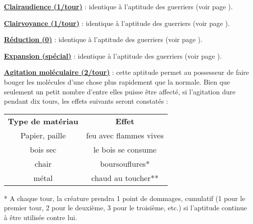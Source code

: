 \bigskip

\textbf{\uline{Clairaudience (1/tour)}} : identique à l'aptitude des guerriers (voir page \pageref{guerrier-clairaudience}).

\bigskip

\textbf{\uline{Clairvoyance (1/tour)}} : identique à l'aptitude des guerriers (voir page \pageref{guerrier-clairvoyance}).

\bigskip

\textbf{\uline{Réduction (0)}} : identique à l'aptitude des guerriers (voir page \pageref{guerrier-reduction}).

\bigskip

\textbf{\uline{Expansion (spécial)}} : identique à l'aptitude des guerriers (voir page \pageref{guerrier-expansion}).

\bigskip

\label{magicien-agitation-mol}\textbf{\uline{Agitation moléculaire (2/tour)}} : cette aptitude permet au possesseur de faire bouger les molécules d'une chose plus rapidement que la normale. Bien que seulement un petit nombre d'entre elles puisse être affecté, si l'agitation dure pendant dix tours, les effets suivants seront constatés :

\medskip

\begin{tabular}{cc}
\textbf{Type de matériau}   & \textbf{Effet} \\
Papier, paille              & feu avec flammes vives \\
bois sec                    & le bois se consume \\
chair                       & boursouflures* \\
métal                       & chaud au toucher** \\
\end{tabular}

\bigskip

* A chaque tour, la créature prendra 1 point de dommages, cumulatif (1 pour le premier tour, 2 pour le deuxième, 3 pour le troisième, etc.) si l'aptitude continue à être utilisée contre lui.

